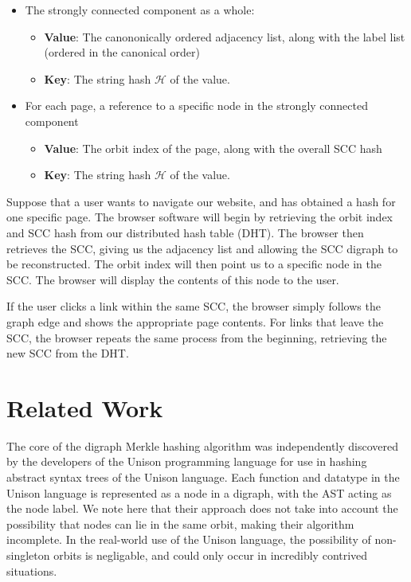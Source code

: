 \documentclass[twoside,leqno]{article}
\begin{document}
\begin{itemize}
  \item The strongly connected component as a whole: \begin{itemize}
    \item \textbf{Value}: The canononically ordered adjacency list, along with the label list (ordered in the canonical order)
    \item \textbf{Key}: The string hash $\mathcal{H}$ of the value.
  \end{itemize}
  \item For each page, a reference to a specific node in the strongly connected component \begin{itemize}
    \item \textbf{Value}: The orbit index of the page, along with the overall SCC hash
    \item \textbf{Key}: The string hash $\mathcal{H}$ of the value.
  \end{itemize}
\end{itemize}

Suppose that a user wants to navigate our website, and has obtained a hash for one specific page. The browser software will begin by retrieving the orbit index and SCC hash from our distributed hash table (DHT). The browser then retrieves the SCC, giving us the adjacency list and allowing the SCC digraph to be reconstructed. The orbit index will then point us to a specific node in the SCC. The browser will display the contents of this node to the user.

If the user clicks a link within the same SCC, the browser simply follows the graph edge and shows the appropriate page contents. For links that leave the SCC, the browser repeats the same process from the beginning, retrieving the new SCC from the DHT.

\section{Related Work}

The core of the digraph Merkle hashing algorithm was independently discovered by the developers of the Unison programming language \cite{unison} for use in hashing abstract syntax trees of the Unison language. Each function and datatype in the Unison language is represented as a node in a digraph, with the AST acting as the node label. We note here that their approach does not take into account the possibility that nodes can lie in the same orbit, making their algorithm incomplete. In the real-world use of the Unison language, the possibility of non-singleton orbits is negligable, and could only occur in incredibly contrived situations.
\end{document}
